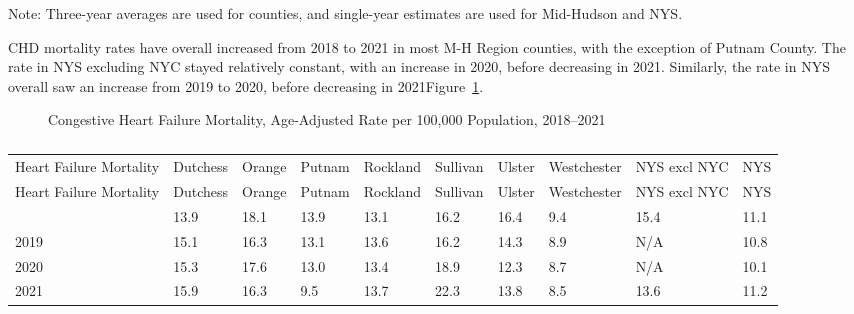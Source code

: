 \documentclass[
  english,
  letterpaper,
]{report}
\begin{document}
\begin{tcolorbox}[enhanced jigsaw, breakable, leftrule=.75mm, title=\textcolor{quarto-callout-note-color}{\faInfo}\hspace{0.5em}{Note}, bottomrule=.15mm, opacityback=0, left=2mm, colback=white, bottomtitle=1mm, coltitle=black, colbacktitle=quarto-callout-note-color!10!white, colframe=quarto-callout-note-color-frame, opacitybacktitle=0.6, toptitle=1mm, titlerule=0mm, arc=.35mm, rightrule=.15mm, toprule=.15mm]

Note: Three-year averages are used for counties, and single-year
estimates are used for Mid-Hudson and NYS.

\end{tcolorbox}

CHD mortality rates have overall increased from 2018 to 2021 in most M-H
Region counties, with the exception of Putnam County. The rate in NYS
excluding NYC stayed relatively constant, with an increase in 2020,
before decreasing in 2021. Similarly, the rate in NYS overall saw an
increase from 2019 to 2020, before decreasing in
2021Figure~\ref{fig-congheartfail-mortal-aar}.

\begin{figure}


\caption{\label{fig-congheartfail-mortal-aar}Congestive Heart Failure
Mortality, Age-Adjusted Rate per 100,000 Population, 2018--2021}

\end{figure}%

\begin{longtable}[]{@{}llllllllll@{}}

\caption{\label{tbl-congheartfail-mortal-aar}Congestive Heart Failure
Mortality, Age-Adjusted Rate per 100,000 Population, 2018--2021}

\tabularnewline

\caption{}\label{T_b2288}\tabularnewline
\toprule\noalign{}
Heart Failure Mortality & Dutchess & Orange & Putnam & Rockland &
Sullivan & Ulster & Westchester & NYS excl NYC & NYS \\
\midrule\noalign{}
\endfirsthead
\toprule\noalign{}
Heart Failure Mortality & Dutchess & Orange & Putnam & Rockland &
Sullivan & Ulster & Westchester & NYS excl NYC & NYS \\
\midrule\noalign{}
\endhead
\bottomrule\noalign{}
\endlastfoot
2018 & 13.9 & 18.1 & 13.9 & 13.1 & 16.2 & 16.4 & 9.4 & 15.4 & 11.1 \\
2019 & 15.1 & 16.3 & 13.1 & 13.6 & 16.2 & 14.3 & 8.9 & N/A & 10.8 \\
2020 & 15.3 & 17.6 & 13.0 & 13.4 & 18.9 & 12.3 & 8.7 & N/A & 10.1 \\
2021 & 15.9 & 16.3 & 9.5 & 13.7 & 22.3 & 13.8 & 8.5 & 13.6 & 11.2 \\

\end{longtable}
\end{document}
